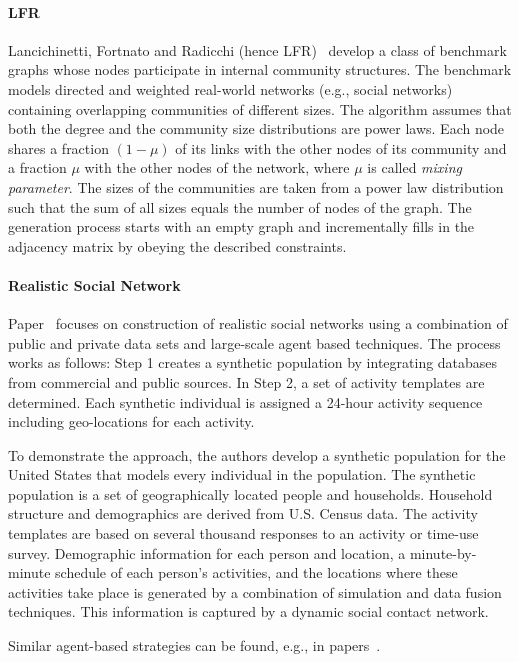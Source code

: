 \paragraph{LFR} Lancichinetti, Fortnato and Radicchi (hence LFR)~\cite{PhysRevE.78.046110} develop a class of benchmark graphs whose nodes participate in internal community structures. The benchmark models directed and weighted real-world networks (e.g., social networks) containing overlapping communities of different sizes. The algorithm assumes that both the degree and the community size distributions are power laws. Each node shares a fraction $(1 - \mu)$ of its links with the other nodes of its community and a fraction $\mu$ with the other nodes of the network, where $\mu$ is called \emph{mixing parameter}. The sizes of the communities are taken from a power law distribution such that the sum of all sizes equals the number of nodes of the graph. The generation process starts with an empty graph and incrementally fills in the adjacency matrix by obeying the described constraints.

\paragraph{Realistic Social Network} Paper~\cite{Barrett:2009:GAL:1995456.1995598} focuses on construction of realistic social networks using a combination of public and private data sets and large-scale agent based techniques. The process works as follows: Step 1 creates a synthetic population by integrating databases from commercial and public sources. In Step 2, a set of activity templates are determined. Each synthetic individual is assigned a 24-hour activity sequence including geo-locations for each activity.

To demonstrate the approach, the authors develop a synthetic population for the United States that models every individual in the population. The synthetic population is a set of geographically located people and households. Household structure and demographics are derived from U.S. Census data. The activity templates are  based on several thousand responses to an activity or time-use survey. Demographic information for each person and location, a minute-by-minute schedule of each person's activities, and the locations where these activities take place is generated by a combination of simulation and data fusion techniques. This information is captured by a dynamic social contact network.

Similar agent-based strategies can be found, e.g., in papers~\cite{Bernstein:2013:SAS:2499604.2499609}.

